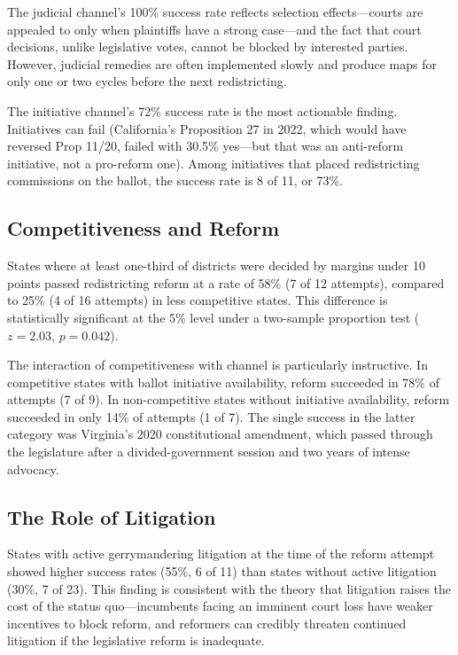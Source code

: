 The judicial channel's 100\% success rate reflects selection effects---courts are appealed to only when plaintiffs have a strong case---and the fact that court decisions, unlike legislative votes, cannot be blocked by interested parties. However, judicial remedies are often implemented slowly and produce maps for only one or two cycles before the next redistricting.

The initiative channel's 72\% success rate is the most actionable finding. Initiatives can fail (California's Proposition 27 in 2022, which would have reversed Prop 11/20, failed with 30.5\% yes---but that was an anti-reform initiative, not a pro-reform one). Among initiatives that placed redistricting commissions on the ballot, the success rate is 8 of 11, or 73\%.

\subsection{Competitiveness and Reform}

States where at least one-third of districts were decided by margins under 10 points passed redistricting reform at a rate of 58\% (7 of 12 attempts), compared to 25\% (4 of 16 attempts) in less competitive states. This difference is statistically significant at the 5\% level under a two-sample proportion test ($z = 2.03$, $p = 0.042$).

The interaction of competitiveness with channel is particularly instructive. In competitive states with ballot initiative availability, reform succeeded in 78\% of attempts (7 of 9). In non-competitive states without initiative availability, reform succeeded in only 14\% of attempts (1 of 7). The single success in the latter category was Virginia's 2020 constitutional amendment, which passed through the legislature after a divided-government session and two years of intense advocacy.

\subsection{The Role of Litigation}

States with active gerrymandering litigation at the time of the reform attempt showed higher success rates (55\%, 6 of 11) than states without active litigation (30\%, 7 of 23). This finding is consistent with the theory that litigation raises the cost of the status quo---incumbents facing an imminent court loss have weaker incentives to block reform, and reformers can credibly threaten continued litigation if the legislative reform is inadequate.

